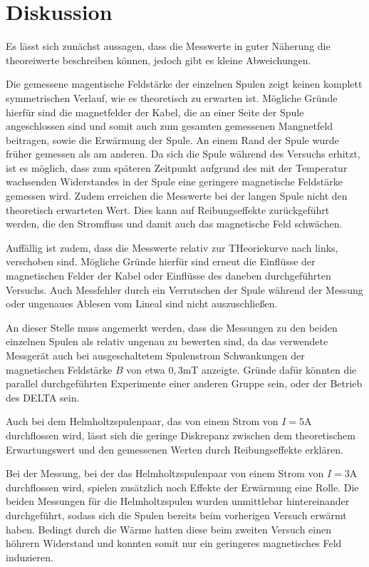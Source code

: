 \section{Diskussion}
\label{sec:Diskussion}
Es lässt sich zunächst aussagen, dass die Messwerte in guter Näherung die theoreiwerte
beschreiben können, jedoch gibt es kleine Abweichungen.

Die gemessene magentische Feldstärke der einzelnen Spulen zeigt keinen komplett
symmetrischen Verlauf, wie es theoretisch zu erwarten ist. Mögliche Gründe hierfür sind
die magnetfelder der Kabel, die an einer Seite der Spule angeschlossen sind und somit
auch zum gesamten gemessenen Mangnetfeld beitragen, sowie die Erwärmung der Spule.
An einem Rand der Spule wurde früher gemessen als am anderen. Da sich die Spule
während des Versuchs erhitzt, ist es möglich, dass zum späteren Zeitpunkt aufgrund des
mit der Temperatur wachsenden Widerstandes in der Spule eine geringere magnetische
Feldstärke gemessen wird. Zudem erreichen die Messwerte bei der langen Spule nicht
den theoretisch erwarteten Wert. Dies kann auf Reibungseffekte zurückgeführt werden,
die den Stromfluss und damit auch das magnetische Feld schwächen.

Auffällig ist zudem, dass die Messwerte relativ zur THeoriekurve nach links, verschoben sind.
Mögliche Gründe hierfür sind erneut die Einflüsse der magnetischen Felder der Kabel oder
Einflüsse des daneben durchgeführten Versuchs. Auch Messfehler durch ein Verrutschen
der Spule während der Messung oder ungenaues Ablesen vom Lineal sind nicht auszuschließen.

An dieser Stelle muss angemerkt werden, dass die Messungen zu den beiden einzelnen Spulen
als relativ ungenau zu bewerten sind, da das verwendete Messgerät auch bei ausgeschaltetem
Spulenstrom Schwankungen der magnetischen Feldstärke $B$ von etwa $0,3$mT anzeigte.
Gründe dafür könnten die parallel durchgeführten Experimente einer anderen Gruppe
sein, oder der Betrieb des DELTA sein.

Auch bei dem Helmholtzspulenpaar, das von einem
Strom von $I=5$A durchflossen wird, lässt sich die geringe Diskrepanz zwischen dem
theoretischem Erwartungswert und den gemessenen Werten durch Reibungseffekte erklären.

Bei der Messung, bei der das Helmholtzspulenpaar von einem Strom von $I=3$A durchflossen
wird, spielen zusätzlich noch Effekte der Erwärmung eine Rolle. Die beiden Messungen
für die Helmholtzspulen wurden unmittlebar hintereinander durchgeführt, sodass sich die
Spulen bereits beim vorherigen Versuch erwärmt haben. Bedingt durch die Wärme
hatten diese beim zweiten Versuch einen höhrern Widerstand und konnten somit nur ein
geringeres magnetisches Feld induzieren.
